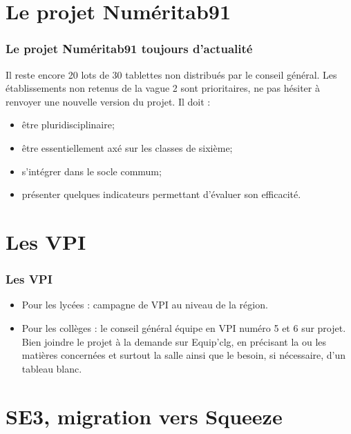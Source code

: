 \documentclass[french]{beamer}
\begin{document}
\section{Le projet Numéritab91}


\begin{frame}%
\frametitle{Le projet Numéritab91 toujours d'actualité}

Il reste encore \alert{20 lots de 30 tablettes} non distribués
par le conseil général. Les établissements non retenus de la vague 2
sont prioritaires, ne pas hésiter à renvoyer une nouvelle version du projet.
Il doit :

\begin{itemize}%
\item être pluridisciplinaire;
\item être essentiellement axé sur les classes de sixième;
\item s'intégrer dans le socle commum;
\item présenter quelques indicateurs permettant d'évaluer son efficacité.
\end{itemize}


\end{frame}



\section{Les VPI}

\begin{frame}%
\frametitle{Les VPI}

\begin{itemize}
\item Pour les lycées : campagne de VPI au niveau de la région.
\item Pour les collèges : le conseil général équipe en VPI
numéro 5 et 6 sur projet. Bien joindre le projet à la demande
sur Equip'clg, en précisant la ou les matières concernées et surtout la salle ainsi que le besoin,
si nécessaire, d'un tableau blanc.
\end{itemize}


\end{frame}



\section[SE3]{SE3, migration vers Squeeze}
\end{document}
